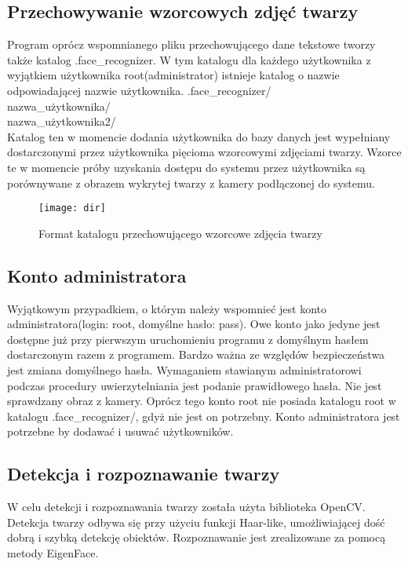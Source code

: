 \documentclass[eng,printmode]{mgr}
\begin{document}
\subsection{Przechowywanie wzorcowych zdjęć twarzy}

Program oprócz wspomnianego pliku przechowującego dane tekstowe tworzy także katalog .face\_recognizer. W tym katalogu dla każdego użytkownika z wyjątkiem użytkownika root(administrator) istnieje katalog o nazwie odpowiadającej nazwie użytkownika.
.face\_recognizer/\\
\textbullet nazwa\_użytkownika/\\
\textbullet nazwa\_użytkownika2/\\
Katalog ten w momencie dodania użytkownika do bazy danych jest wypełniany dostarczonymi przez użytkownika  pięcioma wzorcowymi zdjęciami twarzy. Wzorce te w momencie próby uzyskania dostępu do systemu przez użytkownika są porównywane z obrazem wykrytej twarzy z kamery podłączonej do systemu.\\
\begin{figure}[placement h]
\texttt{[image: dir]}
\caption{Format katalogu przechowującego wzorcowe zdjęcia twarzy }
\end{figure}
\subsection{Konto administratora}

Wyjątkowym przypadkiem, o którym należy wspomnieć jest konto administratora(login: root, domyślne hasło: pass). Owe konto jako jedyne jest dostępne już przy pierwszym uruchomieniu programu z domyślnym hasłem dostarczonym razem z programem. Bardzo ważna ze względów bezpieczeństwa jest zmiana domyślnego hasła. Wymaganiem stawianym administratorowi podczas procedury uwierzytelniania jest podanie prawidłowego hasła. Nie jest sprawdzany obraz z kamery. Oprócz tego konto root nie posiada katalogu root w katalogu .face\_recognizer/, gdyż nie jest on potrzebny. Konto administratora jest potrzebne by dodawać i usuwać użytkowników.

\subsection{Detekcja i rozpoznawanie twarzy}

W celu detekcji i rozpoznawania twarzy została użyta biblioteka OpenCV. Detekcja twarzy odbywa się przy użyciu funkcji Haar-like, umożliwiającej dość dobrą i szybką detekcję obiektów. Rozpoznawanie jest zrealizowane za pomocą metody EigenFace.
\end{document}
